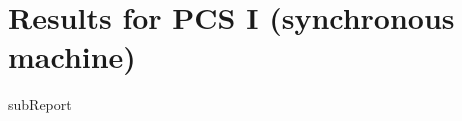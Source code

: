 \renewcommand{\DTRPcs}{I} %
\renewcommand{\DTRPcsLong}{I (synchronous machine)}


    \section{Results for PCS \DTRPcsLong}

    {{subReport}}
    \newpage

